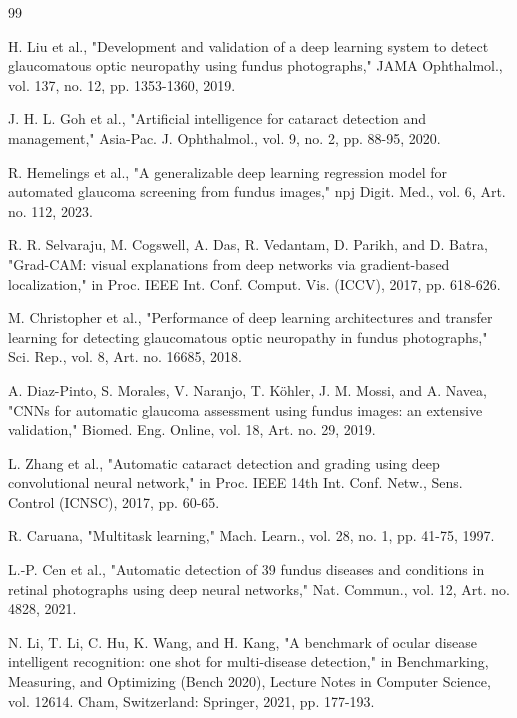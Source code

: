 \documentclass[conference,a4paper]{IEEEtran}
\begin{document}
\begin{thebibliography}{99}

H. Liu et al., "Development and validation of a deep learning system to detect glaucomatous optic
neuropathy using fundus photographs," JAMA Ophthalmol., vol. 137, no. 12, pp. 1353-1360, 2019.


J. H. L. Goh et al., "Artificial intelligence for cataract detection and management," Asia-Pac. J.
Ophthalmol., vol. 9, no. 2, pp. 88-95, 2020.


R. Hemelings et al., "A generalizable deep learning regression model for automated glaucoma
screening from fundus images," npj Digit. Med., vol. 6, Art. no. 112, 2023.


R. R. Selvaraju, M. Cogswell, A. Das, R. Vedantam, D. Parikh, and D. Batra, "Grad-CAM: visual
explanations from deep networks via gradient-based localization," in Proc. IEEE Int. Conf. Comput.
Vis. (ICCV), 2017, pp. 618-626.


M. Christopher et al., "Performance of deep learning architectures and transfer learning for
detecting glaucomatous optic neuropathy in fundus photographs," Sci. Rep., vol. 8, Art. no. 16685,
2018.


A. Diaz-Pinto, S. Morales, V. Naranjo, T. Köhler, J. M. Mossi, and A. Navea, "CNNs for automatic
glaucoma assessment using fundus images: an extensive validation," Biomed. Eng. Online, vol. 18,
Art. no. 29, 2019.


L. Zhang et al., "Automatic cataract detection and grading using deep convolutional neural network,"
in Proc. IEEE 14th Int. Conf. Netw., Sens. Control (ICNSC), 2017, pp. 60-65.


R. Caruana, "Multitask learning," Mach. Learn., vol. 28, no. 1, pp. 41-75, 1997.


L.-P. Cen et al., "Automatic detection of 39 fundus diseases and conditions in retinal photographs
using deep neural networks," Nat. Commun., vol. 12, Art. no. 4828, 2021.


N. Li, T. Li, C. Hu, K. Wang, and H. Kang, "A benchmark of ocular disease intelligent recognition:
one shot for multi-disease detection," in Benchmarking, Measuring, and Optimizing (Bench 2020),
Lecture Notes in Computer Science, vol. 12614. Cham, Switzerland: Springer, 2021, pp. 177-193.


\end{thebibliography}
\end{document}
